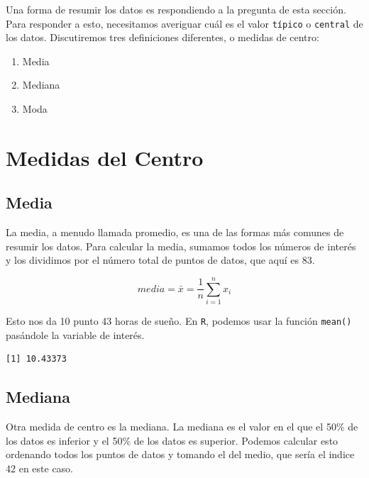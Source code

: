 \documentclass[
  letterpaper,
  DIV=11,
  numbers=noendperiod]{scrreprt}
\newenvironment{Shaded}{\begin{snugshade}}{\end{snugshade}}
\newcommand{\FunctionTok}[1]{\textcolor[rgb]{0.28,0.35,0.67}{#1}}
\newcommand{\NormalTok}[1]{\textcolor[rgb]{0.00,0.23,0.31}{#1}}
\newcommand{\SpecialCharTok}[1]{\textcolor[rgb]{0.37,0.37,0.37}{#1}}
\providecommand{\tightlist}{%
  \setlength{\itemsep}{0pt}\setlength{\parskip}{0pt}}\usepackage{longtable,booktabs,array}
\begin{document}
Una forma de resumir los datos es respondiendo a la pregunta de esta
sección. Para responder a esto, necesitamos averiguar cuál es el valor
\texttt{típico} o \texttt{central} de los datos. Discutiremos tres
definiciones diferentes, o medidas de centro:

\begin{enumerate}
\def\labelenumi{\arabic{enumi}.}
\tightlist
\item
  Media
\item
  Mediana
\item
  Moda
\end{enumerate}

\hypertarget{medidas-del-centro-1}{%
\section{Medidas del Centro}\label{medidas-del-centro-1}}

\hypertarget{media}{%
\subsection{Media}\label{media}}

La media, a menudo llamada promedio, es una de las formas más comunes de
resumir los datos. Para calcular la media, sumamos todos los números de
interés y los dividimos por el número total de puntos de datos, que aquí
es 83.

\[
media = \bar{x} = \frac{1}{n}\sum_{i=1}^n x_i
\]

Esto nos da 10 punto 43 horas de sueño. En \texttt{R}, podemos usar la
función \texttt{mean()} pasándole la variable de interés.

\begin{Shaded}
\end{Shaded}

\begin{verbatim}
[1] 10.43373
\end{verbatim}

\hypertarget{mediana}{%
\subsection{Mediana}\label{mediana}}

Otra medida de centro es la mediana. La mediana es el valor en el que el
50\% de los datos es inferior y el 50\% de los datos es superior.
Podemos calcular esto ordenando todos los puntos de datos y tomando el
del medio, que sería el indice 42 en este caso.
\end{document}
